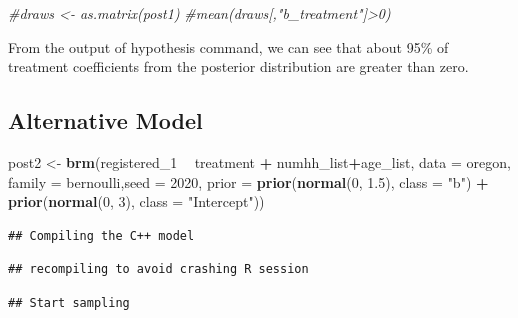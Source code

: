 \documentclass[]{article}
\newenvironment{Shaded}{\begin{snugshade}}{\end{snugshade}}
\newcommand{\CommentTok}[1]{\textcolor[rgb]{0.56,0.35,0.01}{\textit{#1}}}
\newcommand{\DataTypeTok}[1]{\textcolor[rgb]{0.13,0.29,0.53}{#1}}
\newcommand{\DecValTok}[1]{\textcolor[rgb]{0.00,0.00,0.81}{#1}}
\newcommand{\FloatTok}[1]{\textcolor[rgb]{0.00,0.00,0.81}{#1}}
\newcommand{\KeywordTok}[1]{\textcolor[rgb]{0.13,0.29,0.53}{\textbf{#1}}}
\newcommand{\NormalTok}[1]{#1}
\newcommand{\OperatorTok}[1]{\textcolor[rgb]{0.81,0.36,0.00}{\textbf{#1}}}
\newcommand{\StringTok}[1]{\textcolor[rgb]{0.31,0.60,0.02}{#1}}
\begin{document}
\begin{Shaded}
\begin{Highlighting}[]
\CommentTok{#draws <- as.matrix(post1)}
\CommentTok{#mean(draws[,"b_treatment"]>0)}
\end{Highlighting}
\end{Shaded}

From the output of hypothesis command, we can see that about 95\% of
treatment coefficients from the posterior distribution are greater than
zero.

\hypertarget{alternative-model}{%
\subsection{Alternative Model}\label{alternative-model}}

\begin{Shaded}
\begin{Highlighting}[]
\NormalTok{post2 <-}\StringTok{ }\KeywordTok{brm}\NormalTok{(registered_}\DecValTok{1} \OperatorTok{~}\StringTok{ }\NormalTok{treatment }\OperatorTok{+}\StringTok{ }\NormalTok{numhh_list}\OperatorTok{+}\NormalTok{age_list, }\DataTypeTok{data =}\NormalTok{ oregon, }\DataTypeTok{family =}\NormalTok{ bernoulli,}\DataTypeTok{seed =} \DecValTok{2020}\NormalTok{, }\DataTypeTok{prior =} 
               \KeywordTok{prior}\NormalTok{(}\KeywordTok{normal}\NormalTok{(}\DecValTok{0}\NormalTok{, }\FloatTok{1.5}\NormalTok{), }\DataTypeTok{class =} \StringTok{"b"}\NormalTok{) }\OperatorTok{+}\StringTok{ }
\StringTok{               }\KeywordTok{prior}\NormalTok{(}\KeywordTok{normal}\NormalTok{(}\DecValTok{0}\NormalTok{, }\DecValTok{3}\NormalTok{), }\DataTypeTok{class =} \StringTok{"Intercept"}\NormalTok{))}
\end{Highlighting}
\end{Shaded}

\begin{verbatim}
## Compiling the C++ model
\end{verbatim}

\begin{verbatim}
## recompiling to avoid crashing R session
\end{verbatim}

\begin{verbatim}
## Start sampling
\end{verbatim}
\end{document}
